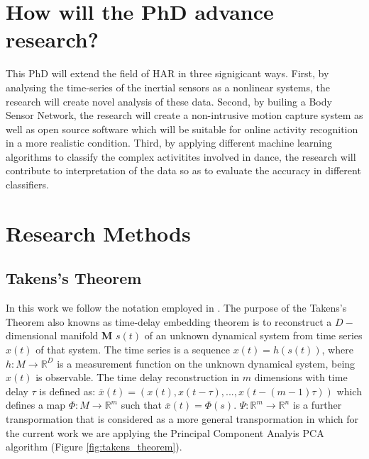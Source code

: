\documentclass{sigchi}
\begin{document}
\section{How will the PhD advance research?}

This PhD will extend the field of HAR in three signigicant ways.
First, by analysing the time-series of the inertial sensors as a nonlinear systems, 
the research will create novel analysis of these data.
Second, by builing a Body Sensor Network, the research will create a non-intrusive motion 
capture system as well as open source software which will be suitable for online activity 
recognition in a more realistic condition. 
Third, by applying different machine learning algorithms to classify the complex activitites 
involved in dance, the research will contribute to interpretation of the data so as
to evaluate the accuracy in different classifiers.

\section{Research Methods}
\subsection{Takens's Theorem}

In this work we follow the notation employed in \cite{Casdagli1991,Uzal2012}.
The purpose of the Takens's Theorem also knowns as time-delay embedding theorem 
is to reconstruct a $D-$dimensional manifold \textbf{M} $s(t)$ of an unknown dynamical 
system from time series $x(t)$ of that system. 
The time series is a sequence $x(t)=h(s(t))$, where $h: M \rightarrow \mathbb{R}^D$
is a measurement function on the unknown dynamical system, being $x(t)$ is observable.
The time delay reconstruction in $m$ dimensions with time delay $\tau$ is defined as:
$\overline{x}(t) = (x(t), x(t-\tau),...,x(t-(m-1)\tau))$ which defines a map
$\varPhi: M \rightarrow \mathbb{R}^m$ such that $\overline{x}(t) = \varPhi(s)$.
$\varPsi: \mathbb{R}^m \rightarrow \mathbb{R}^n$ is a further transpormation that
is considered as a more general transpormation in which for the 
current work we are applying the Principal
Component Analyis PCA algorithm (Figure \ref{fig:takens_theorem}).
\end{document}
